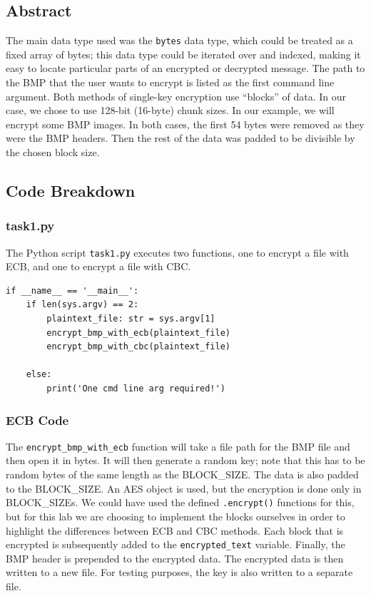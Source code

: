 \documentclass[11pt]{article}
\begin{document}
\subsection*{Abstract}
The main data type used was the \verb|bytes| data type, which could be treated as a fixed array of bytes; this data type could be iterated over and indexed, making it easy to locate particular parts of an encrypted or decrypted message. The path to the BMP that the user wants to encrypt is listed as the first command line argument. Both methods of single-key encryption use ``blocks'' of data. In our case, we chose to use 128-bit (16-byte) chunk sizes. In our example, we will encrypt some BMP images. In both cases, the first 54 bytes were removed as they were the BMP headers. Then the rest of the data was padded to be divisible by the chosen block size.

\subsection*{Code Breakdown}
\subsubsection*{task1.py}

The Python script \verb|task1.py| executes two functions, one to encrypt a file with ECB, and one to encrypt a file with CBC. 

\begin{lstlisting}
if __name__ == '__main__':
    if len(sys.argv) == 2:
        plaintext_file: str = sys.argv[1]
        encrypt_bmp_with_ecb(plaintext_file)
        encrypt_bmp_with_cbc(plaintext_file)

    else:
        print('One cmd line arg required!')
\end{lstlisting}

\subsubsection*{ECB Code}

The \verb|encrypt_bmp_with_ecb| function will take a file path for the BMP file and then open it in bytes. It will then generate a random key; note that this has to be random bytes of the same length as the BLOCK\_SIZE. The data is also padded to the BLOCK\_SIZE. An AES object is used, but the encryption is done only in BLOCK\_SIZEs. We could have used the defined \verb|.encrypt()| functions for this, but for this lab we are choosing to implement the blocks ourselves in order to highlight the differences between ECB and CBC methods. Each block that is encrypted is subsequently added to the \verb|encrypted_text| variable. Finally, the BMP header is prepended to the encrypted data. The encrypted data is then written to a new file. For testing purposes, the key is also written to a separate file. 
\end{document}
